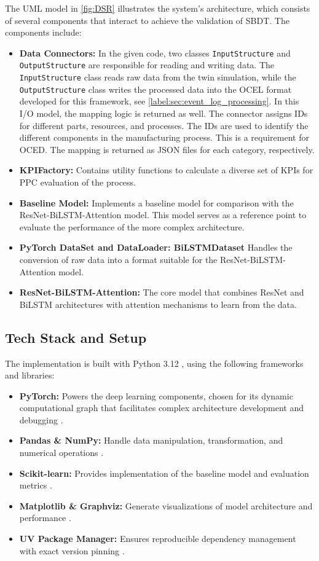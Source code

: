 The UML model \autocite{PlantUML} in \autoref{fig:DSR} illustrates the system's architecture, which consists of several components that interact to achieve the validation of SBDT. The components include:
\begin{itemize}
  \item \textbf{Data Connectors:} In the given code, two classes \texttt{InputStructure} and \texttt{OutputStructure} are responsible for reading and writing data. The \texttt{InputStructure} class reads raw data from the twin simulation, while the \texttt{OutputStructure} class writes the processed data into the OCEL format developed for this framework, see \autoref{label:sec:event_log_processing}. In this I/O model, the mapping logic is returned as well. The connector assigns IDs for different parts, resources, and processes. The IDs are used to identify the different components in the manufacturing process. This is a requirement for OCED. The mapping is returned as JSON files for each category, respectively.
  \item \textbf{KPIFactory:} Contains utility functions to calculate a diverse set of KPIs for PPC evaluation of the process.
  \item \textbf{Baseline Model:} Implements a baseline model for comparison with the ResNet-BiLSTM-Attention model. This model serves as a reference point to evaluate the performance of the more complex architecture.
  \item \textbf{PyTorch DataSet and DataLoader: BiLSTMDataset} Handles the conversion of raw data into a format suitable for the ResNet-BiLSTM-Attention model.
  \item \textbf{ResNet-BiLSTM-Attention:} The core model that combines ResNet and BiLSTM architectures with attention mechanisms to learn from the data.
\end{itemize}

\subsection{Tech Stack and Setup}
The implementation is built with Python 3.12 \autocite{Python}, using the following frameworks and libraries:

\begin{itemize}
  \item \textbf{PyTorch:} Powers the deep learning components, chosen for its dynamic computational graph that facilitates complex architecture development and debugging \autocite{PyTorch}.
  \item \textbf{Pandas \& NumPy:} Handle data manipulation, transformation, and numerical operations \autocite{NumPy, Pandas}.
  \item \textbf{Scikit-learn:} Provides implementation of the baseline model and evaluation metrics \autocite{ScikitLearn}.
  \item \textbf{Matplotlib \& Graphviz:} Generate visualizations of model architecture and performance \autocite{Matplotlib, Graphviz}.
  \item \textbf{UV Package Manager:} Ensures reproducible dependency management with exact version pinning \autocite{UV}.
\end{itemize}


